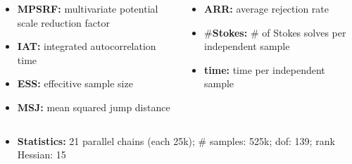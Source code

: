 \documentclass[10pt,final,xcolor=dvipsnames]{beamer}
\begin{document}
\begin{frame}
\begin{columns}
  \begin{column}{0.45\columnwidth}
    \begin{itemize}
    \item {\bfseries MPSRF:} multivariate potential scale reduction factor
      \vspace{-0.02in}
    \item {\bfseries IAT:} integrated autocorrelation time
      \vspace{-0.02in}
    \item {\bfseries ESS:} effecitive sample size
      \vspace{-0.02in}
    \item {\bfseries MSJ:} mean squared jump distance
    \end{itemize}
  \end{column}
  \begin{column}{0.45\columnwidth}
    \begin{itemize}
    \item {\bfseries ARR:} average rejection rate
      \vspace{-0.02in}
    \item {\bfseries $\#$Stokes:} $\#$ of Stokes solves per independent sample
      \vspace{-0.02in}
    \item {\bfseries time:} time per independent sample
    \end{itemize}
  \end{column}
\end{columns}

\begin{columns}
  \hspace{0.26in}
  \begin{column}{0.95\columnwidth}
    \begin{itemize}
    \item {\bfseries Statistics:} 21 parallel chains (each 25k); $\#$
      samples: 525k; dof: 139; rank Hessian: 15
    \end{itemize}
  \end{column}
  \begin{column}{0.5\columnwidth}
  \end{column}
\end{columns}

\vspace{0.05in}


\end{frame}
\end{document}
